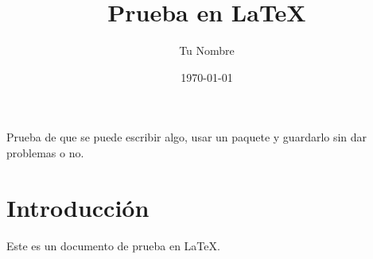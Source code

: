 \documentclass{article}
\title{Prueba en LaTeX}
\author{Tu Nombre}
\date{\today}
\begin{document}
\maketitle
Prueba de que se puede escribir algo, usar un paquete y guardarlo sin dar problemas o no.
\section{Introducción}
Este es un documento de prueba en LaTeX.
\end{document}
